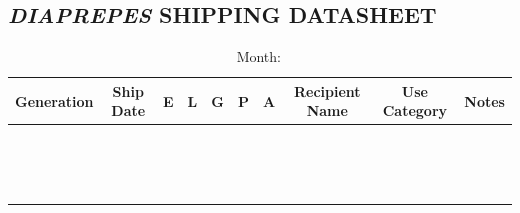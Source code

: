 \documentclass{sop_class}[overrideChapters] %
\begin{document}
{\begin{landscape}
\section{\textit{DIAPREPES} SHIPPING DATASHEET}\label{shipping-datasheet}
\begin{table}[!htbp]
    \centering
    \setlength{\tabcolsep}{0.5em}
      \begin{threeparttable}
        \caption*{Month$\colon$}
              \begin{tabular}{|c|c|c|c|c|c|c|c|c|c|}
            \toprule
            \hline
            {Generation} & {Ship Date} & {E} & {L} & {G} & {P} & {A} & {Recipient Name} & {Use Category} & {Notes}\\
            \hline
            {} & {} & {} & {} & {} & {} & {} & {} & {} & {}\\
            \hline
            {} & {} & {} & {} & {} & {} & {} & {} & {} & {}\\
            \hline
            {} & {} & {} & {} & {} & {} & {} & {} & {} & {}\\
            \hline
            {} & {} & {} & {} & {} & {} & {} & {} & {} & {}\\
            \hline
            {} & {} & {} & {} & {} & {} & {} & {} & {} & {}\\
            \hline
            {} & {} & {} & {} & {} & {} & {} & {} & {} & {}\\
            \hline
            {} & {} & {} & {} & {} & {} & {} & {} & {} & {}\\
            \hline
            {} & {} & {} & {} & {} & {} & {} & {} & {} & {}\\
            \hline
            {} & {} & {} & {} & {} & {} & {} & {} & {} & {}\\
            \hline
            {} & {} & {} & {} & {} & {} & {} & {} & {} & {}\\
            \hline
            {} & {} & {} & {} & {} & {} & {} & {} & {} & {}\\
            \hline
            {} & {} & {} & {} & {} & {} & {} & {} & {} & {}\\
            \hline
            {} & {} & {} & {} & {} & {} & {} & {} & {} & {}\\
            \hline
            {} & {} & {} & {} & {} & {} & {} & {} & {} & {}\\
            \hline
            {} & {} & {} & {} & {} & {} & {} & {} & {} & {}\\
            \hline

\end{tabular}
\end{threeparttable}
\end{table}
\end{landscape}}
\end{document}
